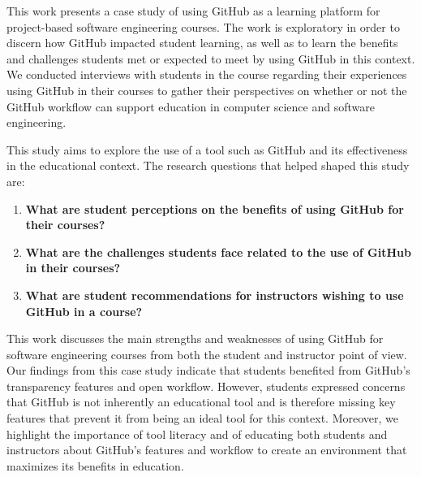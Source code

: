
This work presents a case study of using GitHub as a learning platform for project-based software engineering courses. The work is exploratory in order to discern how GitHub impacted student learning, as well as to learn the benefits and challenges students met or expected to meet by using GitHub in this context. We conducted interviews with students in the course regarding their experiences using GitHub in their courses to gather their perspectives on whether or not the GitHub workflow can support education in computer science and software engineering.%


This study aims to explore the use of a tool such as GitHub and its effectiveness in the educational context. The research questions that helped shaped this study are:%
\begin{enumerate}
\item \textbf{What are student perceptions on the benefits of using GitHub for their courses?}
\item \textbf{What are the challenges students face related to the use of GitHub in their courses?}
\item \textbf{What are student recommendations for instructors wishing to use GitHub in a course?}
\end{enumerate}

This work discusses the main strengths and weaknesses of using GitHub for software engineering courses from both the student and instructor point of view. Our findings from this case study indicate that students benefited from GitHub's transparency features and open workflow. However, students expressed concerns that GitHub is not inherently an educational tool and is therefore missing key features that prevent it from being an ideal tool for this context. Moreover, we highlight the importance of tool literacy and of educating both students and instructors about GitHub's features and workflow to create an environment that maximizes its benefits in education.


